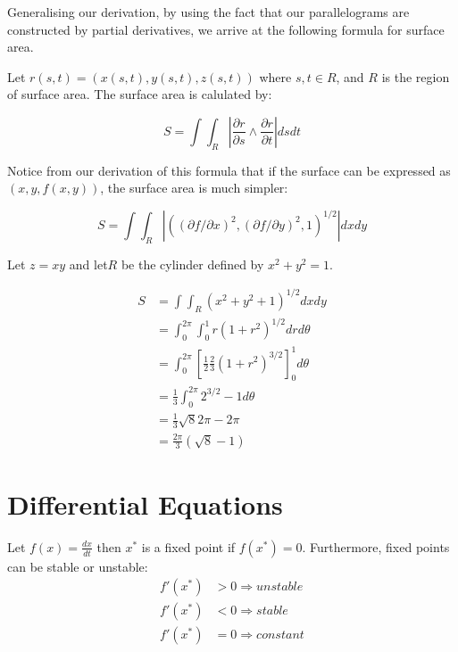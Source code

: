 \documentclass[a4paper,10pt]{article}
\begin{document}
Generalising our derivation, by using the fact that our parallelograms
are constructed by partial derivatives, we arrive at the following
formula for surface area.

Let $r(s,t) = (x(s,t), y(s,t), z(s,t))$ where $s,t \in R$, and $R$ is the
region of surface area. The surface area is calulated by:

\[
	S = \int \int_R \left| \frac{\partial r}{\partial s} \wedge
	\frac{\partial r}{\partial t} \right| dsdt
\]

Notice from our derivation of this formula that if the surface can be
expressed as $(x,y,f(x,y))$, the surface area is much simpler:

\[
	S = \int \int_R \left|
	\left(
		(\partial f / \partial x)^2,
		(\partial f / \partial y)^2,
		1
	\right)^{1/2}
	\right|
	dxdy
\]

\begin{ex}
	Let $z=xy$ and let$R$ be the cylinder defined by $x^2 + y^2 = 1$.

	\begin{align*}
		S &= \int \int_R \left( x^2 + y^2 + 1 \right)^{1/2} dxdy \\
		&= \int_0^{2\pi} \int_0^1 r(1+r^2)^{1/2} drd\theta \\
		&= \int_0^{2\pi}
		\left[
			\frac{1}{2} \frac{2}{3} (1+r^2)^{3/2}
		\right]_0^1 d\theta \\
		&= \frac{1}{3} \int_0^{2\pi} 2^{3/2} - 1 d\theta \\
		&= \frac{1}{3} \sqrt{8} 2\pi - 2\pi \\
		&= \frac{2\pi}{3} (\sqrt{8} - 1)
	\end{align*}
\end{ex}

\section{Differential Equations}

\begin{defn}
	Let $f(x) = \frac{dx}{dt}$ then $x^*$ is a fixed point if $f(x^*) = 0$.
	Furthermore, fixed points can be stable or unstable:
	\begin{align*}
		f'(x^*) &> 0 \Rightarrow unstable \\
		f'(x^*) &< 0 \Rightarrow stable \\
		f'(x^*) &= 0 \Rightarrow constant
	\end{align*}
\end{defn}
\end{document}
